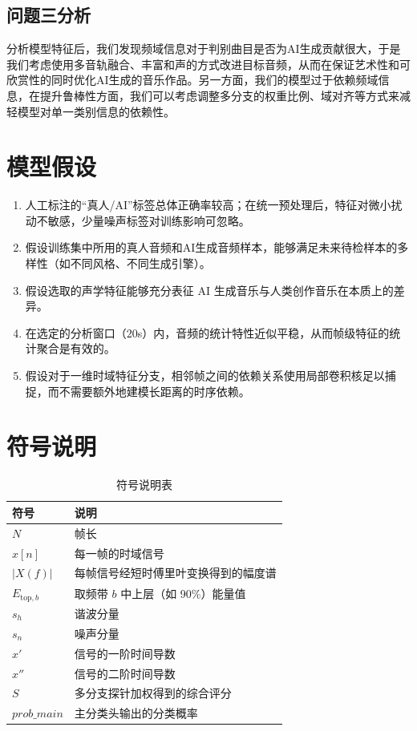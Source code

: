 \documentclass[a4paper,12pt]{article}
\begin{document}
\subsection{问题三分析}
分析模型特征后，我们发现频域信息对于判别曲目是否为AI生成贡献很大，于是我们考虑使用多音轨融合、丰富和声的方式改进目标音频，从而在保证艺术性和可欣赏性的同时优化AI生成的音乐作品。另一方面，我们的模型过于依赖频域信息，在提升鲁棒性方面，我们可以考虑调整多分支的权重比例、域对齐等方式来减轻模型对单一类别信息的依赖性。

\section{模型假设}
\begin{enumerate}
    \item 人工标注的“真人/AI”标签总体正确率较高；在统一预处理后，特征对微小扰动不敏感，少量噪声标签对训练影响可忽略。
    \item 假设训练集中所用的真人音频和AI生成音频样本，能够满足未来待检样本的多样性（如不同风格、不同生成引擎）。
    \item 假设选取的声学特征能够充分表征 AI 生成音乐与人类创作音乐在本质上的差异。
    \item 在选定的分析窗口（$20$s）内，音频的统计特性近似平稳，从而帧级特征的统计聚合是有效的。
    \item 假设对于一维时域特征分支，相邻帧之间的依赖关系使用局部卷积核足以捕捉，而不需要额外地建模长距离的时序依赖。
    
\end{enumerate}

\section{符号说明}

\begin{table}[H]
\centering
\caption{符号说明表}
\begin{tabular}{ll}
\toprule
\textbf{符号} & \textbf{说明} \\
\midrule
$N$ & 帧长 \\
$x[n]$ & 每一帧的时域信号 \\
$|X(f)|$ & 每帧信号经短时傅里叶变换得到的幅度谱 \\
$E_{\mathrm{top},b}$ & 取频带 $b$ 中上层（如 90\%）能量值 \\
$s_h$ & 谐波分量 \\
$s_n$ & 噪声分量 \\
$x'$ & 信号的一阶时间导数 \\
$x''$ & 信号的二阶时间导数 \\
$S$ & 多分支探针加权得到的综合评分 \\
$prob\_main$ & 主分类头输出的分类概率 \\
\bottomrule
\end{tabular}
\end{table}
\end{document}
